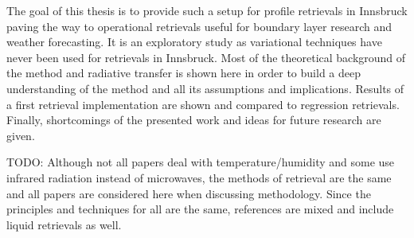     The goal of this thesis is to provide such a setup for profile retrievals
    in Innsbruck paving the way to operational retrievals useful for boundary
    layer research and weather forecasting. It is an exploratory study as
    variational techniques have never been used for retrievals in Innsbruck.
    Most of the theoretical background of the method and radiative transfer
    is shown here in order to build a deep understanding of the method and all
    its assumptions and implications. Results of a first retrieval
    implementation are shown and compared to regression retrievals. Finally,
    shortcomings of the presented work and ideas for future research are
    given.

    TODO: Although not all papers deal with temperature/humidity and some use
    infrared radiation instead of microwaves, the methods of retrieval are the
    same and all papers are considered here when discussing methodology.
    Since the principles and techniques for all are the same, references are
    mixed and include liquid retrievals as well.

\stopsection

